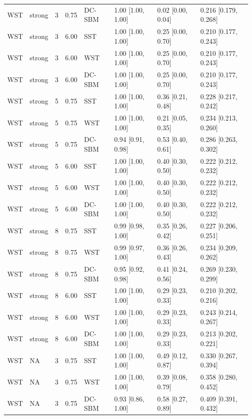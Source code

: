 \begin{table}
\begin{tabular}[t]{llrrllll}
WST & strong & 3 & 0.75 & DC-SBM & 1.00 [1.00, 1.00] & 0.02 [0.00, 0.04] & 0.216 [0.179, 0.268]\\
\addlinespace
WST & strong & 3 & 6.00 & SST & 1.00 [1.00, 1.00] & 0.25 [0.00, 0.70] & 0.210 [0.177, 0.243]\\
WST & strong & 3 & 6.00 & WST & 1.00 [1.00, 1.00] & 0.25 [0.00, 0.70] & 0.210 [0.177, 0.243]\\
WST & strong & 3 & 6.00 & DC-SBM & 1.00 [1.00, 1.00] & 0.25 [0.00, 0.70] & 0.210 [0.177, 0.243]\\
WST & strong & 5 & 0.75 & SST & 1.00 [1.00, 1.00] & 0.36 [0.21, 0.48] & 0.228 [0.217, 0.242]\\
WST & strong & 5 & 0.75 & WST & 1.00 [1.00, 1.00] & 0.21 [0.05, 0.35] & 0.234 [0.213, 0.260]\\
\addlinespace
WST & strong & 5 & 0.75 & DC-SBM & 0.94 [0.91, 0.98] & 0.53 [0.40, 0.61] & 0.286 [0.263, 0.302]\\
WST & strong & 5 & 6.00 & SST & 1.00 [1.00, 1.00] & 0.40 [0.30, 0.50] & 0.222 [0.212, 0.232]\\
WST & strong & 5 & 6.00 & WST & 1.00 [1.00, 1.00] & 0.40 [0.30, 0.50] & 0.222 [0.212, 0.232]\\
WST & strong & 5 & 6.00 & DC-SBM & 1.00 [1.00, 1.00] & 0.40 [0.30, 0.50] & 0.222 [0.212, 0.232]\\
WST & strong & 8 & 0.75 & SST & 0.99 [0.98, 1.00] & 0.35 [0.26, 0.42] & 0.227 [0.206, 0.251]\\
\addlinespace
WST & strong & 8 & 0.75 & WST & 0.99 [0.97, 1.00] & 0.36 [0.26, 0.43] & 0.234 [0.209, 0.262]\\
WST & strong & 8 & 0.75 & DC-SBM & 0.95 [0.92, 0.98] & 0.41 [0.24, 0.56] & 0.269 [0.230, 0.299]\\
WST & strong & 8 & 6.00 & SST & 1.00 [1.00, 1.00] & 0.29 [0.23, 0.33] & 0.210 [0.202, 0.216]\\
WST & strong & 8 & 6.00 & WST & 1.00 [1.00, 1.00] & 0.29 [0.23, 0.33] & 0.243 [0.214, 0.267]\\
WST & strong & 8 & 6.00 & DC-SBM & 1.00 [1.00, 1.00] & 0.29 [0.23, 0.33] & 0.213 [0.202, 0.221]\\
\addlinespace
WST & NA & 3 & 0.75 & SST & 1.00 [1.00, 1.00] & 0.49 [0.12, 0.87] & 0.330 [0.267, 0.394]\\
WST & NA & 3 & 0.75 & WST & 1.00 [1.00, 1.00] & 0.39 [0.08, 0.79] & 0.358 [0.280, 0.452]\\
WST & NA & 3 & 0.75 & DC-SBM & 0.93 [0.86, 1.00] & 0.58 [0.27, 0.89] & 0.409 [0.391, 0.432]\\

\end{tabular}
\end{table}
